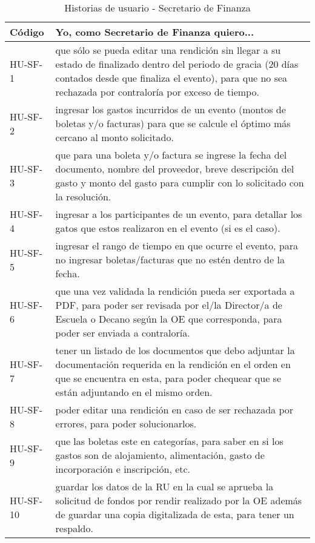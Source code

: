 \begin{table}[htbp]
    \centering
    \caption{Historias de usuario - Secretario de Finanza}
    \label{tabla:Historias_Ususario_Secretario_Finanza}
    \begin{tabular}{| p{2.6cm}| p{12.2cm} |}
    \hline
    Código & Yo, como Secretario de Finanza quiero... \\
    \hline \hline
    
    HU-SF-1 & que sólo se pueda editar una rendición sin llegar a su estado de finalizado dentro del periodo de gracia (20 días contados desde que finaliza el evento), para que no sea rechazada por contraloría por exceso de tiempo. \\ \hline

    HU-SF-2 & ingresar los gastos incurridos de un evento (montos de boletas y/o facturas) para que se calcule el óptimo más cercano al monto solicitado. \\ \hline

    HU-SF-3 & que para una boleta y/o factura se ingrese la fecha del documento, nombre del proveedor, breve descripción del gasto y monto del gasto para cumplir con lo solicitado con la resolución. \\ \hline

    HU-SF-4 & ingresar a los participantes de un evento, para detallar los gatos que estos realizaron en el evento (si es el caso). \\ \hline

    HU-SF-5 & ingresar el rango de tiempo en que ocurre el evento, para no ingresar boletas/facturas que no estén dentro de la fecha. \\ \hline

    HU-SF-6 & que una vez validada la rendición pueda ser exportada a PDF, para poder ser revisada por el/la Director/a de Escuela o Decano según la OE que corresponda, para poder ser enviada a contraloría. \\ \hline

    HU-SF-7 & tener un listado de los documentos que debo adjuntar la documentación requerida en la rendición en el orden en que se encuentra en esta, para poder chequear que se están adjuntando en el mismo orden. \\ \hline

    HU-SF-8 & poder editar una rendición en caso de ser rechazada por errores, para poder solucionarlos. \\ \hline

    HU-SF-9 & que las boletas este en categorías, para saber en si los gastos son de alojamiento, alimentación, gasto de incorporación e inscripción, etc. \\ \hline

    HU-SF-10 & guardar los datos de la RU en la cual se aprueba la solicitud de fondos por rendir realizado por la OE además de guardar una copia digitalizada de esta, para tener un respaldo.\\ \hline
    \end{tabular}
\end{table}

